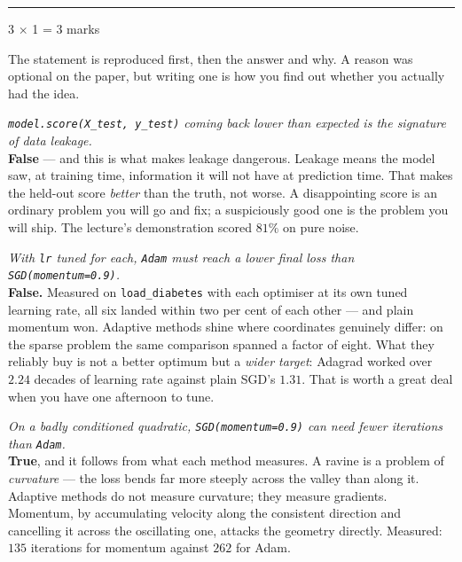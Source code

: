 \documentclass[10pt,a4paper]{article}
\newcommand{\parthead}[2]{\vspace{2pt}\noindent\rule{\linewidth}{0.4pt}\par\vspace{2pt}%
  \noindent{\bfseries Part #1}\hfill{\small #2}\par\vspace{1pt}}
\begin{document}
\newpage

\parthead{C --- True or false}{3 $\times$ 1 = 3 marks}

{\small The statement is reproduced first, then the answer and why. A reason was optional on the paper, but writing one is how you find out whether you actually had the idea.}

\begin{sC}

  \item \emph{\texttt{model.score(X\_test, y\_test)} coming back \emph{lower} than expected is the signature of data leakage.}\\[2pt] \textbf{False} --- and this is what makes leakage dangerous. Leakage means the model saw, at training time, information it will not have at prediction time. That makes the held-out score \emph{better} than the truth, not worse. A disappointing score is an ordinary problem you will go and fix; a suspiciously good one is the problem you will ship. The lecture's demonstration scored $81\%$ on pure noise.

  \item \emph{With \texttt{lr} tuned for each, \texttt{Adam} must reach a lower final loss than \texttt{SGD(momentum=0.9)}.}\\[2pt] \textbf{False.} Measured on \texttt{load\_diabetes} with each optimiser at its own tuned learning rate, all six landed within two per cent of each other --- and plain momentum won. Adaptive methods shine where coordinates genuinely differ: on the sparse problem the same comparison spanned a factor of eight. What they reliably buy is not a better optimum but a \emph{wider target}: Adagrad worked over $2.24$ decades of learning rate against plain SGD's $1.31$. That is worth a great deal when you have one afternoon to tune.

  \item \emph{On a badly conditioned quadratic, \texttt{SGD(momentum=0.9)} can need fewer iterations than \texttt{Adam}.}\\[2pt] \textbf{True}, and it follows from what each method measures. A ravine is a problem of \emph{curvature} --- the loss bends far more steeply across the valley than along it. Adaptive methods do not measure curvature; they measure gradients. Momentum, by accumulating velocity along the consistent direction and cancelling it across the oscillating one, attacks the geometry directly. Measured: $135$ iterations for momentum against $262$ for Adam.

\end{sC}
\end{document}
